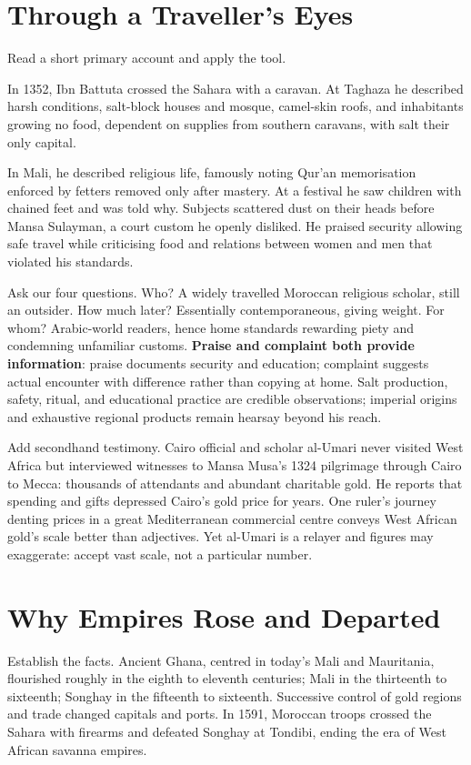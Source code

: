 \section{Through a Traveller's Eyes}
Read a short primary account and apply the tool.

In 1352, Ibn Battuta crossed the Sahara with a caravan. At Taghaza he described harsh conditions, salt-block houses and mosque, camel-skin roofs, and inhabitants growing no food, dependent on supplies from southern caravans, with salt their only capital.

In Mali, he described religious life, famously noting Qur'an memorisation enforced by fetters removed only after mastery. At a festival he saw children with chained feet and was told why. Subjects scattered dust on their heads before Mansa Sulayman, a court custom he openly disliked. He praised security allowing safe travel while criticising food and relations between women and men that violated his standards.

Ask our four questions. Who? A widely travelled Moroccan religious scholar, still an outsider. How much later? Essentially contemporaneous, giving weight. For whom? Arabic-world readers, hence home standards rewarding piety and condemning unfamiliar customs. \textbf{Praise and complaint both provide information}: praise documents security and education; complaint suggests actual encounter with difference rather than copying at home. Salt production, safety, ritual, and educational practice are credible observations; imperial origins and exhaustive regional products remain hearsay beyond his reach.

Add secondhand testimony. Cairo official and scholar al-Umari never visited West Africa but interviewed witnesses to Mansa Musa's 1324 pilgrimage through Cairo to Mecca: thousands of attendants and abundant charitable gold. He reports that spending and gifts depressed Cairo's gold price for years. One ruler's journey denting prices in a great Mediterranean commercial centre conveys West African gold's scale better than adjectives. Yet al-Umari is a relayer and figures may exaggerate: accept vast scale, not a particular number.

\section{Why Empires Rose and Departed}
Establish the facts. Ancient Ghana, centred in today's Mali and Mauritania, flourished roughly in the eighth to eleventh centuries; Mali in the thirteenth to sixteenth; Songhay in the fifteenth to sixteenth. Successive control of gold regions and trade changed capitals and ports. In 1591, Moroccan troops crossed the Sahara with firearms and defeated Songhay at Tondibi, ending the era of West African savanna empires.


